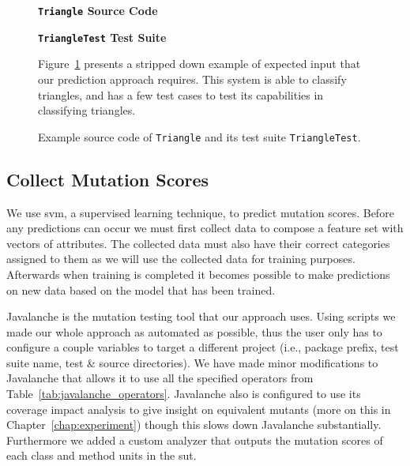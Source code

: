 \begin{figure}[h]
  \centering
  \begin{minipage}{7.25cm}
  \centering
  \footnotesize{\textbf{\texttt{Triangle} Source Code}}
  
  \end{minipage}
  \hfill
  \begin{minipage}{7.25cm}
  \centering
  \footnotesize{\textbf{\texttt{TriangleTest} Test Suite}}
  
  \end{minipage}
  \caption{Example source code of \texttt{Triangle} and its test suite \texttt{TriangleTest}.}
  \vspace{1mm}
  \footnotesize{Figure~\ref{fig:triangle_example} presents a stripped down example of expected input that our prediction approach requires. This system is able to classify triangles, and has a few test cases to test its capabilities in classifying triangles.}
  \vspace{1mm}
  \label{fig:triangle_example}
\end{figure}


\subsection{Collect Mutation Scores}
\label{subsec:appraoch_collect_mutation_scores}
We use \gls{svm}, a supervised learning technique, to predict mutation scores. Before any predictions can occur we must first collect data to compose a feature set with vectors of attributes. The collected data must also have their correct categories assigned to them as we will use the collected data for training purposes. Afterwards when training is completed it becomes possible to make predictions on new data based on the model that has been trained.

Javalanche is the mutation testing tool that our approach uses. Using scripts we made our whole approach as automated as possible, thus the user only has to configure a couple variables to target a different project (i.e., package prefix, test suite name, test \& source directories). We have made minor modifications to Javalanche that allows it to use all the specified operators from Table~\ref{tab:javalanche_operators}. Javalanche also is configured to use its coverage impact analysis to give insight on equivalent mutants (more on this in Chapter~\ref{chap:experiment}) though this slows down Javalanche substantially. Furthermore we added a custom analyzer that outputs the mutation scores of each class and method units in the \gls{sut}.

